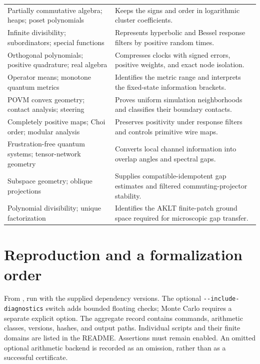 {\begin{longtable}{@{}p{.29\linewidth}p{.66\linewidth}@{}}
Partially commutative algebra; heaps; poset polynomials & Keeps the
signs and order in logarithmic cluster coefficients.\\
Infinite divisibility; subordinators; special functions & Represents
hyperbolic and Bessel response filters by positive random times.\\
Orthogonal polynomials; positive quadrature; real algebra & Compresses
clocks with signed errors, positive weights, and exact node isolation.\\
Operator means; monotone quantum metrics & Identifies the metric range
and interprets the fixed-state information brackets.\\
POVM convex geometry; contact analysis; steering & Proves uniform
simulation neighborhoods and classifies their boundary contacts.\\
Completely positive maps; Choi order; modular analysis & Preserves
positivity under response filters and controls primitive wire maps.\\
Frustration-free quantum systems; tensor-network geometry & Converts
local channel information into overlap angles and spectral gaps.\\
Subspace geometry; oblique projections & Supplies compatible-idempotent
gap estimates and filtered commuting-projector stability.\\
Polynomial divisibility; unique factorization & Identifies the AKLT
finite-patch ground space required for microscopic gap transfer.\\
\bottomrule
\end{longtable}}

\section{Reproduction and a formalization order}

From , run  with the supplied
dependency versions. The optional \texttt{-{}-include-diagnostics} switch
adds bounded floating checks; Monte Carlo requires a separate explicit
option. The aggregate record 
contains commands, arithmetic classes, versions, hashes, and output paths.
Individual scripts and their finite domains are listed in the README.
Assertions must remain enabled. An omitted optional arithmetic backend
is recorded as an omission, rather than as a successful certificate.

